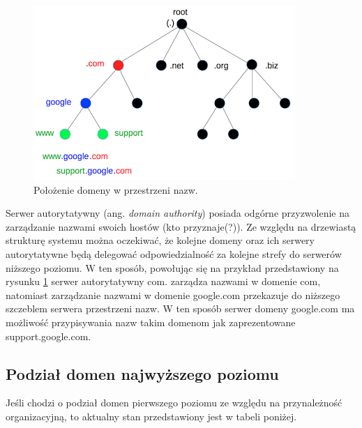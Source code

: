 \begin{center}
	\begin{figure}
	\includegraphics[scale=1]{image/domain_tree}
	\caption{Położenie domeny w przestrzeni nazw. \cite{domain_tree_src}}
	\label{example_domain_tree}
	\end{figure}
\end{center}

Serwer autorytatywny (ang. \textit{domain authority}) posiada odgórne przyzwolenie na zarządzanie nazwami swoich hostów (kto przyznaje(?)). Ze względu na drzewiastą strukturę systemu można oczekiwać, że kolejne domeny oraz ich serwery autorytatywne będą delegować odpowiedzialność za kolejne strefy do serwerów niższego poziomu. W ten sposób, powołując się na przykład przedstawiony na rysunku \ref{example_domain_tree} serwer autorytatywny com. zarządza nazwami w domenie com, natomiast zarządzanie nazwami w domenie google.com przekazuje do niższego szczeblem serwera przestrzeni nazw. W ten sposób serwer domeny google.com ma możliwość przypisywania nazw takim domenom jak zaprezentowane support.google.com.

\subsection{Podział domen najwyższego poziomu}
Jeśli chodzi o podział domen pierwszego poziomu ze względu na przynależność organizacyjną, to aktualny stan przedstawiony jest w tabeli poniżej.


